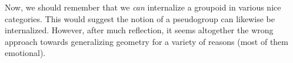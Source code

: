 \begin{rmk}[Internalization]
Now, we should remember that we \emph{can} internalize a groupoid
in various nice categories. This would suggest the notion of a
pseudogroup can likewise be internalized. However, after much
reflection, it seems altogether the wrong approach towards
generalizing geometry for a variety of reasons (most of them
emotional). 
\end{rmk}
